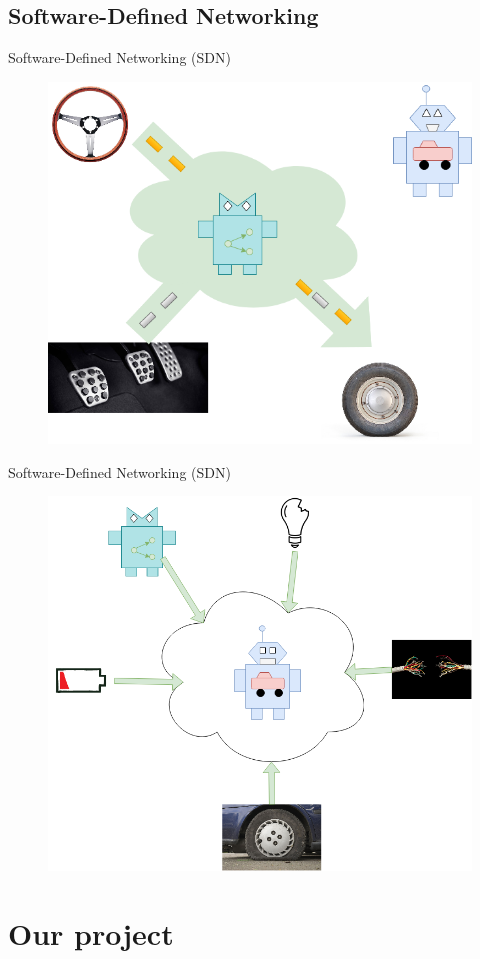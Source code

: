 \documentclass{beamer}
\begin{document}
\subsection{Software-Defined Networking}
\begin{frame}{Software-Defined Networking (SDN)}
    \begin{figure}
        \includegraphics[width=0.75\linewidth]{routing.png}
    \end{figure}
\end{frame}

\begin{frame}{Software-Defined Networking (SDN)}
    \begin{figure}
        \includegraphics[width=0.7\linewidth]{cooperating.png}
    \end{figure}
\end{frame}

\section{Our project}
\end{document}
